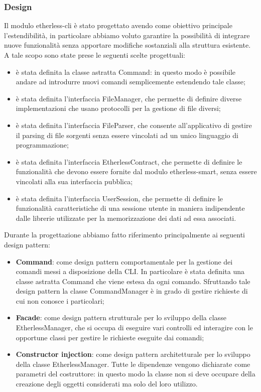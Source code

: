 \subsubsection{Design}
Il modulo etherless-cli è stato progettato avendo come obiettivo principale l'estendibilità, in particolare abbiamo voluto garantire la possibilità di integrare nuove funzionalità senza apportare modifiche sostanziali alla struttura esistente. A tale scopo sono state prese le seguenti scelte progettuali: 
\begin{itemize}
	\item è stata definita la classe astratta Command: in questo modo è possibile andare ad introdurre nuovi comandi semplicemente estendendo tale classe;  
	\item è stata definita l'interfaccia FileManager, che permette di definire diverse implementazioni che usano protocolli per la gestione di file diversi; 
	\item è stata definita l'interfaccia FileParser, che consente all'applicativo di gestire il parsing di file sorgenti senza essere vincolati ad un unico linguaggio di programmazione; 
	\item è stata definita l'interfaccia EtherlessContract, che permette di definire le funzionalità che devono essere fornite dal modulo etherless-smart, senza essere vincolati alla sua interfaccia pubblica; 
	\item è stata definita l'interfaccia UserSession, che permette di definire le funzionalità caratteristiche di una sessione utente in maniera indipendente dalle librerie utilizzate per la memorizzazione dei dati ad essa associati.  
\end{itemize}

Durante la progettazione abbiamo fatto riferimento principalmente ai seguenti design pattern:
\begin{itemize}
	\item \textbf{Command}: come design pattern comportamentale per la gestione dei comandi messi a disposizione della CLI. In particolare è stata definita una classe astratta Command che viene estesa da ogni comando. Sfruttando tale design pattern la classe CommandManager è in grado di gestire richieste di cui non conosce i particolari; 

	\item \textbf{Facade}: come design pattern strutturale per lo sviluppo della classe EtherlessManager, che si occupa di eseguire vari controlli ed interagire con le opportune classi per gestire le richieste eseguite dai comandi;

	\item \textbf{Constructor injection}: come design pattern architetturale per lo sviluppo della classe EtherlessManager. Tutte le dipendenze vengono dichiarate come parametri del costruttore: in questo modo la classe non si deve occupare della creazione degli oggetti considerati ma solo del loro utilizzo. 
\end{itemize}

